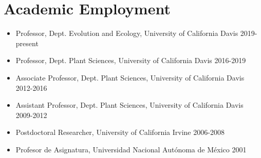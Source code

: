 \section*{Academic Employment}
\begin{itemize}
\setlength\itemsep{0ex}
\item Professor, Dept. Evolution and Ecology, University of California Davis 2019-present
\item Professor, Dept. Plant Sciences, University of California Davis 2016-2019
\item Associate Professor, Dept. Plant Sciences, University of California Davis 2012-2016
\item Assistant Professor, Dept. Plant Sciences, University of California Davis 2009-2012
\item Postdoctoral Researcher, University of California Irvine 2006-2008
\item Profesor de Asignatura, Universidad Nacional Aut\'{o}noma de M\'{e}xico 2001
\end{itemize}

